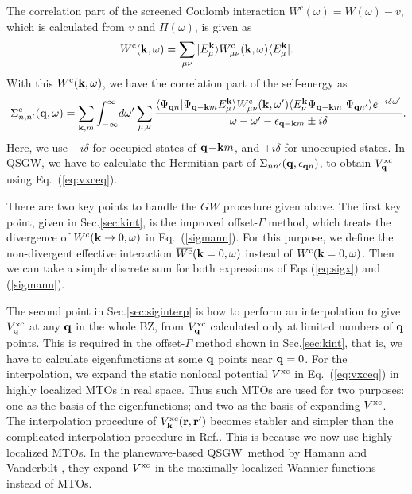 \documentclass[a4paper,10pt,epsf,fleqn]{article}
\def\QSGW{QS{GW}}
\def\Psiqn{{\Psi_{{\bf q}n}}}
\def\vxc{V^{\rm xc}}
\def\Psiqkm{{\Psi_{{\bf q}-{\bf k}m}}}
\def\Psiqnp{{\Psi_{{\bf q}n'}}}
\def\Psiqn{{\Psi_{{\bf q}n}}}
\newcommand{\bfq}{{\bf q}}
\newcommand{\bfk}{{\bf k}}
\newcommand{\bfr}{{\bf r}}
\newcommand{\req}[1]{\mbox{Eq.~(\ref{#1})}}
\begin{document}
The correlation part of the screened Coulomb interaction $W^c(\omega)=W(\omega)-v$, 
which is calculated from $v$ and $\Pi(\omega)$, is given as
\begin{eqnarray}
W^{\rm c}(\bfk,\omega)=\sum_{\mu\nu} | E^{\bfk}_\mu \rangle {W^{\rm c}_{\mu\nu}(\bfk,\omega)} 
\langle E^{\bfk}_\mu |.
\end{eqnarray}
With this $W^{\rm c}(\bfk,\omega)$, we have the correlation part of the self-energy  as
\begin{eqnarray}\
\Sigma^{\rm c}_{n,n'}(\bfq,\omega)= \sum_{\bfk,m} \int_{-\infty}^\infty  \!d \omega' \sum_{\mu,\nu} 
\frac{\langle\Psiqn|\Psiqkm E^{\bfk}_\mu \rangle 
W^{\rm c}_{\mu\nu}(\bfk,\omega')\langle E^{\bfk}_\nu \Psiqkm
|\Psiqnp\rangle e^{-i \delta \omega'}}
{\omega-\omega'-\epsilon_{\bfq-\bfk m}\pm i \delta}.
\label{sigmann}
\end{eqnarray}
Here, we use $-i \delta$ for occupied states of
${\bfq\!-\!\bfk m}$, and $+i \delta$ for unoccupied states.
In \QSGW, we have to calculate the Hermitian part of $\Sigma_{nn'}(\bfq,\epsilon_{\bfq n})$, 
to obtain $\vxc_\bfq$ using \req{eq:vxceq}.

There are two key points to handle the $GW$ procedure given above.
The first key point, given in Sec.\ref{sec:kint},
is the improved offset-$\Gamma$ method, which treats
the divergence of $W^{\rm c}(\bfk \to 0,\omega)$ in \req{sigmann}. 
For this purpose, we define the non-divergent 
effective interaction $\overline{W^{\rm c}}(\bfk=0,\omega)$ instead of
${W^{\rm c}}(\bfk=0,\omega)$.
Then we can take a simple discrete sum for both expressions of
Eqs.(\ref{eq:sigx}) and (\ref{sigmann}).

The second point in Sec.\ref{sec:siginterp} is
how to perform
an interpolation to give $\vxc_\bfq$ at any $\bfq$ in the whole BZ,
from $\vxc_\bfq$ calculated only at limited numbers of $\bfq$ points.
This is required in the offset-$\Gamma$ method shown in Sec.\ref{sec:kint},
that is, we have to calculate eigenfunctions at some $\bfq$ points near $\bfq=0$.
For the interpolation, we expand the static
nonlocal potential $\vxc$ in \req{eq:vxceq} in highly localized
MTOs in real space. Thus such MTOs are used for two purposes:
one as the basis of the eigenfunctions; and two as the basis of 
expanding $\vxc$. The interpolation procedure of $\vxc_\bfk(\bfr,\bfr')$
becomes stabler and simpler than the
complicated interpolation procedure in 
Ref.\cite{kotani_quasiparticle_2007}.
This is because we now use highly localized MTOs.
In the planewave-based \QSGW\ method by Hamann and Vanderbilt \cite{hamann09}, 
they expand $\vxc$ in the maximally localized Wannier functions instead of MTOs.
\end{document}
